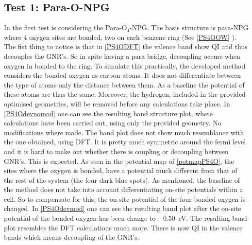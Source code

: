 \subsection{Test 1: Para-O-NPG}
In the first test is considering the Para-O\(_4\)-NPG. The basis structure is para-NPG where 4 oxygen sites are bonded, two on each benzene ring (See \cref{PS4OOW} ). The fist thing to notice is that in \cref{PS4ODFT} the valence band show QI and thus decouples the GNR's. So in spite having a para bridge, decoupling occurs when oxygen in bonded to the ring. To simulate this practically, the developed method considers the bonded oxygen as carbon atoms. It does not differentiate between the type of atoms only the distance between them. As a baseline the potential of these atoms are thus the same. Moreover, the hydrogen, included in the provided optimised geometries, will be removed before any calculations take place. In \cref{PS4Odevnomod} one can see the resulting band structure plot, where calculations have been carried out, using only the provided geometry. No modifications where made. The band plot does not show much resemblance with the one obtained, using DFT. It is pretty much symmetric around the fermi level and it is hard to make out whether there is coupling or decoupling between GNR's. This is expected. As seen in the potential map of \cref{potmapPS4O}, the sites where the oxygen is bonded, have a potential much different from that of the rest of the system (the four dark blue spots). As mentioned, the baseline of the method does not take into account differentiating on-site potentials within a cell. So to compensate for this, the on-site potential of the four bonded oxygen is changed. In \cref{PS4Odevmod} one can see the resulting band plot after the on-site potential of the bonded oxygen has been change to \SI{-0.50}{\electronvolt}. The resulting band plot resembles the DFT calculations much more. There is now QI in the valence bands which means decoupling of the GNR's.
